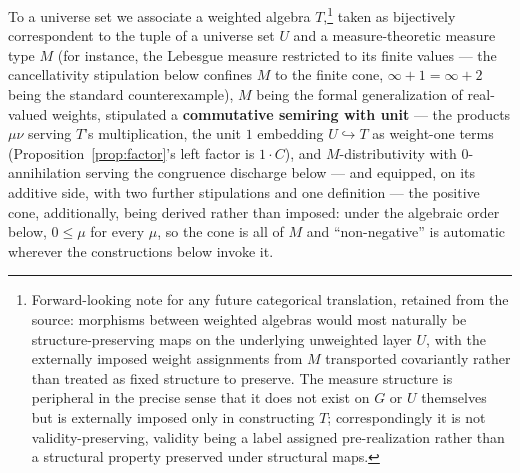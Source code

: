 To a universe set we associate a weighted algebra $T$,\footnote{Forward-looking note for any future categorical translation, retained from the source: morphisms between weighted algebras would most naturally be structure-preserving maps on the underlying unweighted layer $U$, with the externally imposed weight assignments from $M$ transported covariantly rather than treated as fixed structure to preserve. The measure structure is peripheral in the precise sense that it does not exist on $G$ or $U$ themselves but is externally imposed only in constructing $T$; correspondingly it is not validity-preserving, validity being a label assigned pre-realization rather than a structural property preserved under structural maps.} taken as bijectively correspondent to the tuple of a universe set $U$ and a measure-theoretic measure type $M$ (for instance, the Lebesgue measure restricted to its finite values --- the cancellativity stipulation below confines $M$ to the finite cone, $\infty + 1 = \infty + 2$ being the standard counterexample), $M$ being the formal generalization of real-valued weights, stipulated a \textbf{commutative semiring with unit} --- the products $\mu\nu$ serving $T$'s multiplication, the unit $1$ embedding $U \hookrightarrow T$ as weight-one terms (Proposition~\ref{prop:factor}'s left factor is $1 \cdot C$), and $M$-distributivity with $0$-annihilation serving the congruence discharge below --- and equipped, on its additive side, with two further stipulations and one definition --- the positive cone, additionally, being derived rather than imposed: under the algebraic order below, $0 \leq \mu$ for every $\mu$, so the cone is all of $M$ and ``non-negative'' is automatic wherever the constructions below invoke it.
